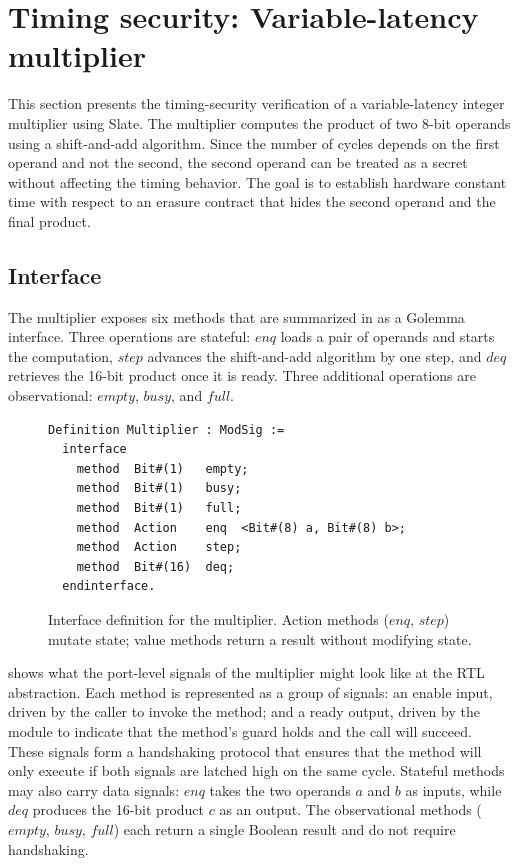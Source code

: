 \documentclass[fontset=fira-newtxsf]{mitthesis}
\theoremstyle{definition}
\theoremstyle{plain}
\begin{document}
\section{Timing security: Variable-latency multiplier} \label{sec:case-study-multiplier}

This section presents the timing-security verification of a variable-latency integer multiplier using Slate.
The multiplier computes the product of two 8-bit operands using a shift-and-add algorithm.
Since the number of cycles depends on the first operand and not the second, the second operand can be treated as a secret without affecting the timing behavior.
The goal is to establish hardware constant time with respect to an erasure contract that hides the second operand and the final product.

\subsection{Interface}

The multiplier exposes six methods that are summarized in  as a Golemma interface.
Three operations are stateful: $\mathit{enq}$ loads a pair of operands and starts the computation, $\mathit{step}$ advances the shift-and-add algorithm by one step, and $\mathit{deq}$ retrieves the 16-bit product once it is ready.
Three additional operations are observational: $\mathit{empty}$, $\mathit{busy}$, and $\mathit{full}$.

\begin{figure}[H]
\begin{verbatim}
Definition Multiplier : ModSig :=
  interface
    method  Bit#(1)   empty;
    method  Bit#(1)   busy;
    method  Bit#(1)   full;
    method  Action    enq  <Bit#(8) a, Bit#(8) b>;
    method  Action    step;
    method  Bit#(16)  deq;
  endinterface.
\end{verbatim}
\caption[Multiplier interface]{Interface definition for the multiplier. Action methods ($\mathit{enq}$, $\mathit{step}$) mutate state; value methods return a result without modifying state.}
\label{fig:mult-intf}
\end{figure}

 shows what the port-level signals of the multiplier might look like at the RTL abstraction.
Each method is represented as a group of signals: an enable input, driven by the caller to invoke the method; and a ready output, driven by the module to indicate that the method's guard holds and the call will succeed.
These signals form a handshaking protocol that ensures that the method will only execute if both signals are latched high on the same cycle.
Stateful methods may also carry data signals: $\mathit{enq}$ takes the two operands $\mathit{a}$ and $\mathit{b}$ as inputs, while $\mathit{deq}$ produces the 16-bit product $\mathit{c}$ as an output.
The observational methods ($\mathit{empty}$, $\mathit{busy}$, $\mathit{full}$) each return a single Boolean result and do not require handshaking.
\end{document}
